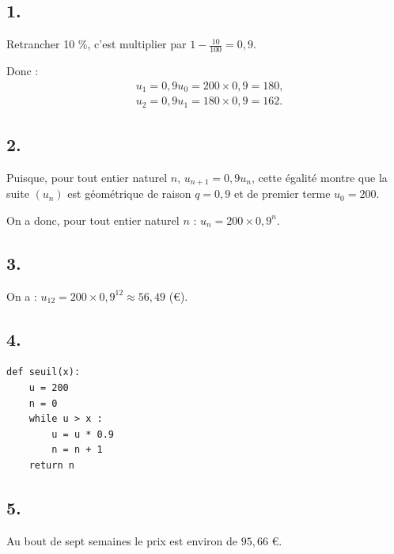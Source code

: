 \subsection*{1.}

Retrancher 10 \%, c'est multiplier par \(1 - \frac{10}{100} = 0{,}9\).

Donc :
\begin{align*}
&u_1 = 0{,}9 u_0 = 200 \times 0{,}9 = 180, \\
&u_2 = 0{,}9 u_1 = 180 \times 0{,}9 = 162.
\end{align*}

\subsection*{2.}

Puisque, pour tout entier naturel \(n\), \(u_{n+1} = 0{,}9 u_n\), cette égalité montre que la suite \((u_n)\) est géométrique de raison \(q = 0{,}9\) et de premier terme \(u_0 = 200\).

On a donc, pour tout entier naturel \(n\) : \(u_n = 200 \times 0{,}9^n\).

\subsection*{3.}

On a : \(u_{12} = 200 \times 0{,}9^{12} \approx 56{,}49\) (€).

\subsection*{4.}

\begin{center}
\begin{lstlisting}[style=python]
def seuil(x):
    u = 200
    n = 0
    while u > x :
        u = u * 0.9
        n = n + 1
    return n
\end{lstlisting}
\end{center}

\subsection*{5.}

Au bout de sept semaines le prix est environ de \(95{,}66\) €.
